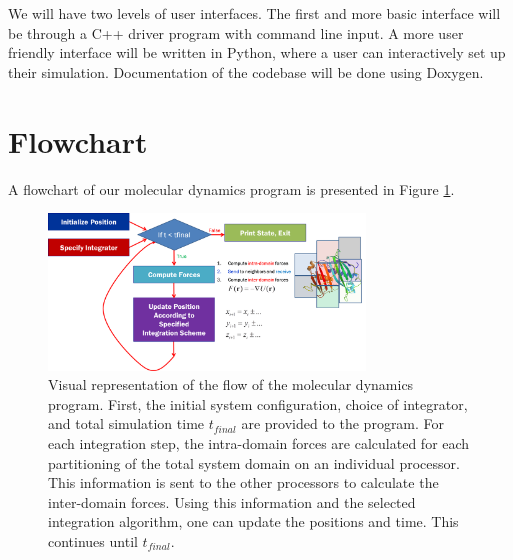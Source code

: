 \documentclass[10pt]{article}
\begin{document}
We will have two levels of user interfaces.  The first and more basic interface will be through a C++ driver program with command line input.  A more user friendly interface will be written in Python, where a user can interactively set up their simulation. Documentation of the codebase will be done using Doxygen.



\section{Flowchart}
A flowchart of our molecular dynamics program is presented in Figure \ref{fig:flowchart}.
\begin{figure}[h]
\centering
\includegraphics[width=0.75\textwidth]{flowchart.png}
\caption{Visual representation of the flow of the molecular dynamics program. First, the initial system configuration, choice of integrator, and total simulation time $t_{final}$  are provided to the program. For each integration step, the intra-domain forces are calculated for each partitioning of the total system domain on an individual processor. This information is sent to the other processors to calculate the inter-domain forces. Using this information and the selected integration algorithm, one can update the positions and time. This continues until $t_{final}$.}
\label{fig:flowchart}
\end{figure}
\end{document}
